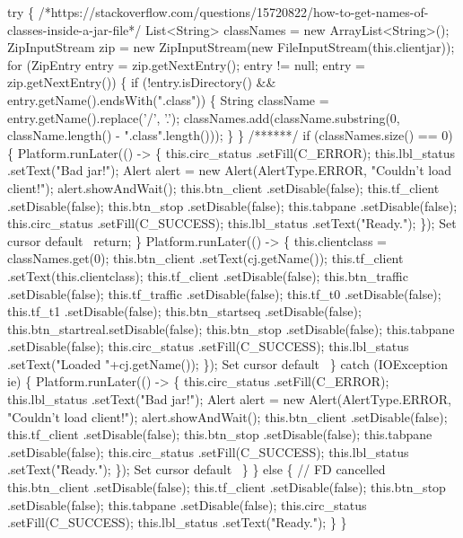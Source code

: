     try \{
/*https://stackoverflow.com/questions/15720822/how-to-get-names-of-classes-inside-a-jar-file*/
List<String> classNames = new ArrayList<String>();
ZipInputStream zip = new ZipInputStream(new FileInputStream(this.clientjar));
for (ZipEntry entry = zip.getNextEntry(); entry != null; entry = zip.getNextEntry()) \{
  if (!entry.isDirectory() && entry.getName().endsWith(".class")) \{
    String className = entry.getName().replace('/', '.');
    classNames.add(className.substring(0, className.length() - ".class".length()));
  \}
\}
/******/
      if (classNames.size() == 0) \{
        Platform.runLater(() -> \{
          this.circ_status  .setFill(C_ERROR);
          this.lbl_status   .setText("Bad jar!");
          Alert alert = new Alert(AlertType.ERROR, "Couldn't load client!");
          alert.showAndWait();
          this.btn_client   .setDisable(false);
          this.tf_client    .setDisable(false);
          this.btn_stop     .setDisable(false);
          this.tabpane      .setDisable(false);
          this.circ_status  .setFill(C_SUCCESS);
          this.lbl_status   .setText("Ready.");
        \});
        \LA{}Set cursor default~{\nwtagstyle{}}\RA{}
        return;
      \}
      Platform.runLater(() -> \{
        this.clientclass = classNames.get(0);
        this.btn_client   .setText(cj.getName());
        this.tf_client    .setText(this.clientclass);
        this.tf_client    .setDisable(false);
        this.btn_traffic  .setDisable(false);
        this.tf_traffic   .setDisable(false);
        this.tf_t0        .setDisable(false);
        this.tf_t1        .setDisable(false);
        this.btn_startseq .setDisable(false);
        this.btn_startreal.setDisable(false);
        this.btn_stop     .setDisable(false);
        this.tabpane      .setDisable(false);
        this.circ_status  .setFill(C_SUCCESS);
        this.lbl_status   .setText("Loaded "+cj.getName());
      \});
      \LA{}Set cursor default~{\nwtagstyle{}}\RA{}
    \} catch (IOException ie) \{
      Platform.runLater(() -> \{
        this.circ_status  .setFill(C_ERROR);
        this.lbl_status   .setText("Bad jar!");
        Alert alert = new Alert(AlertType.ERROR, "Couldn't load client!");
        alert.showAndWait();
        this.btn_client   .setDisable(false);
        this.tf_client    .setDisable(false);
        this.btn_stop     .setDisable(false);
        this.tabpane      .setDisable(false);
        this.circ_status  .setFill(C_SUCCESS);
        this.lbl_status   .setText("Ready.");
      \});
      \LA{}Set cursor default~{\nwtagstyle{}}\RA{}
    \}
  \} else \{
    // FD cancelled
    this.btn_client   .setDisable(false);
    this.tf_client    .setDisable(false);
    this.btn_stop     .setDisable(false);
    this.tabpane      .setDisable(false);
    this.circ_status  .setFill(C_SUCCESS);
    this.lbl_status   .setText("Ready.");
  \}
\}
\nwendcode{}\nwdocspar

